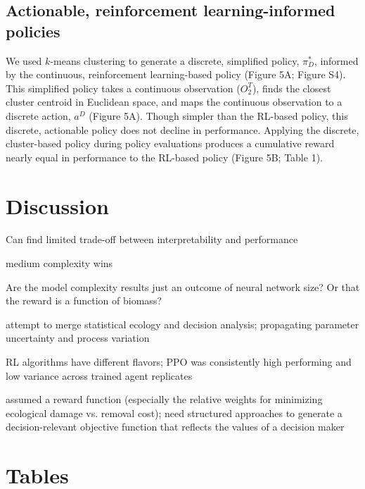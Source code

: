 \documentclass{article}
\begin{document}
\subsection{Actionable, reinforcement learning-informed policies}

We used $k$-means clustering to generate a discrete, simplified policy, $\pi^*_D$, informed by the continuous, reinforcement learning-based policy (Figure 5A; Figure S4). This simplified policy takes a continuous observation ($O^T_2$), finds the closest cluster centroid in Euclidean space, and maps the continuous observation to a discrete action, $a^D$ (Figure 5A). Though simpler than the RL-based policy, this discrete, actionable policy does not decline in performance. Applying the discrete, cluster-based policy during policy evaluations produces a cumulative reward nearly equal in performance to the RL-based policy (Figure 5B; Table 1).


\section{Discussion}

Can find limited trade-off between interpretability and performance

medium complexity wins

Are the model complexity results just an outcome of neural network size? Or that the reward is a function of biomass?

attempt to merge statistical ecology and decision analysis; propagating parameter uncertainty and process variation

RL algorithms have different flavors; PPO was consistently high performing and low variance across trained agent replicates

assumed a reward function (especially the relative weights for minimizing ecological damage vs. removal cost); need structured approaches to generate a decision-relevant objective function that reflects the values of a decision maker

\newpage

\section{Tables}
\end{document}
